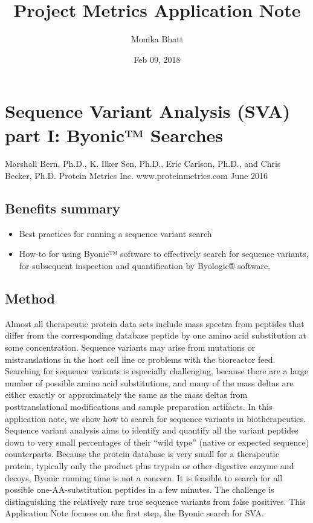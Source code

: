 \documentclass[letterpaper,10pt,oneside,english]{sphinxmanual}
\title{Project Metrics Application Note}
\date{Feb 09, 2018}
\author{Monika Bhatt}
\begin{document}
\maketitle
\sphinxtableofcontents
{}\label{\detokenize{index::doc}}



\chapter{Sequence Variant Analysis (SVA) part I: Byonic™ Searches}
\label{\detokenize{applicationnote:welcome-to-protein-metrics-s-documentation}}\label{\detokenize{applicationnote::doc}}\label{\detokenize{applicationnote:sequence-variant-analysis-sva-part-i-byonic-searches}}
Marshall Bern, Ph.D., K. Ilker Sen, Ph.D., Eric Carlson, Ph.D., and Chris Becker, Ph.D.
Protein Metrics Inc. www.proteinmetrics.com
June 2016


\section{Benefits summary}
\label{\detokenize{applicationnote:benefits-summary}}\begin{itemize}
\item {} 
Best practices for running a sequence variant search

\item {} 
How-to for using Byonic™ software to effectively search for sequence variants, for subsequent inspection and quantification by Byologic® software.

\end{itemize}


\section{Method}
\label{\detokenize{applicationnote:method}}
Almost all therapeutic protein data sets include mass spectra from peptides that differ from the corresponding database peptide by one amino acid substitution at some concentration.  Sequence variants may arise from mutations or mistranslations in the host cell line or problems with the bioreactor feed.  Searching for sequence variants is especially challenging, because there are a large number of possible amino acid substitutions, and many of the mass deltas are either exactly or approximately the same as the mass deltas from posttranslational modifications and sample preparation artifacts.  In this application note, we show how to search for sequence variants in biotherapeutics.
Sequence variant analysis aims to identify and quantify all the variant peptides down to very small percentages of their “wild type” (native or expected sequence) counterparts.  Because the protein database is very small for a therapeutic protein, typically only the product plus trypsin or other digestive enzyme and decoys, Byonic running time is not a concern. It is feasible to search for all possible one-AA-substitution peptides in a few minutes.  The challenge is distinguishing the relatively rare true sequence variants from false positives.
This Application Note focuses on the first step, the Byonic search for SVA.
\end{document}
